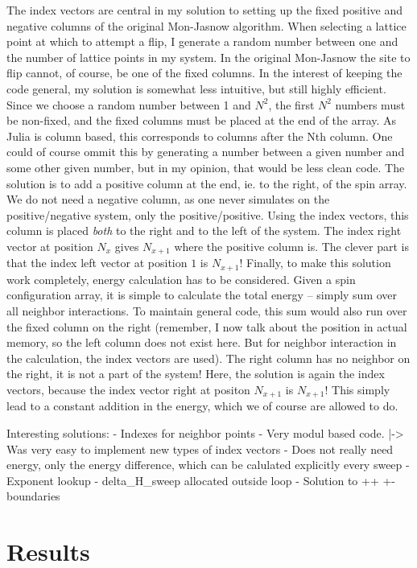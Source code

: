 \documentclass{article}
\begin{document}
The index vectors are central in my solution to setting up the fixed positive and negative columns of the original Mon-Jasnow algorithm.
When selecting a lattice point at which to attempt a flip, I generate a random number between one and the number of lattice points in my system.
In the original Mon-Jasnow the site to flip cannot, of course, be one of the fixed columns.
In the interest of keeping the code general, my solution is somewhat less intuitive, but still highly efficient.
Since we choose a random number between 1 and $N^2$, the first $N^2$ numbers must be non-fixed, and the fixed columns must be placed at the end of the array.
As Julia is column based, this corresponds to columns after the Nth column.
One could of course ommit this by generating a number between a given number and some other given number, but in my opinion, that would be less clean code.
The solution is to add a positive column at the end, ie. to the right, of the spin array.
We do not need a negative column, as one never simulates on the positive/negative system, only the positive/positive.
Using the index vectors, this column is placed \emph{both} to the right and to the left of the system.
The index right vector at position $N_x$ gives $N_{x+1}$ where the positive column is.
The clever part is that the index left vector at position $1$ is $N_{x+1}$!
Finally, to make this solution work completely, energy calculation has to be considered.
Given a spin configuration array, it is simple to calculate the total energy -- simply sum over all neighbor interactions.
To maintain general code, this sum would also run over the fixed column on the right (remember, I now talk about the position in actual memory, so the left column does not exist here. But for neighbor interaction in the calculation, the index vectors are used).
The right column has no neighbor on the right, it is not a part of the system!
Here, the solution is again the index vectors, because the index vector right at positon $N_{x+1}$ is $N_{x+1}$!
This simply lead to a constant addition in the energy, which we of course are allowed to do.

Interesting solutions:
- Indexes for neighbor points
- Very modul based code.
  |-> Was very easy to implement new types of index vectors
- Does not really need energy, only the energy difference, which can be calulated explicitly every sweep
- Exponent lookup
- delta_H_sweep allocated outside loop
- Solution to ++ +- boundaries


\section{Results}
\end{document}

